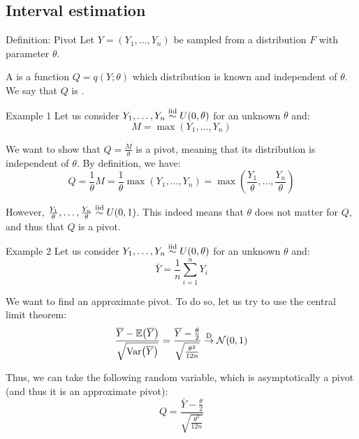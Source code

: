 \documentclass[a4paper]{article}
\begin{document}
\subsection{Interval estimation}

\begin{parag}{Definition: Pivot}
    Let $Y = \left(Y_1, \ldots, Y_n\right)$ be sampled from a distribution $F$ with parameter $\theta$.

    A  is a function $Q = q\left(Y; \theta\right)$ which distribution is known and independent of $\theta$. We say that $Q$ is .
\end{parag}

\begin{parag}{Example 1}
    Let us consider $Y_1, \ldots, Y_n \iid U\left(0, \theta\right)$ for an unknown $\theta$ and:
    \[M = \max\left(Y_1, \ldots, Y_n\right)\]
    
    We want to show that $Q = \frac{M}{\theta}$ is a pivot, meaning that its distribution is independent of $\theta$. By definition, we have: 
    \[Q = \frac{1}{\theta} M = \frac{1}{\theta} \max\left(Y_1, \ldots, Y_n\right) = \max\left(\frac{Y_1}{\theta}, \ldots, \frac{Y_n}{\theta}\right)\]

    However, $\frac{Y_1}{\theta}, \ldots, \frac{Y_n}{\theta} \iid U\left(0, 1\right)$. This indeed means that $\theta$ does not matter for $Q$, and thus that $Q$ is a pivot.
\end{parag}

\begin{parag}{Example 2}
    Let us consider $Y_1, \ldots, Y_n \iid U\left(0, \theta\right)$ for an unknown $\theta$ and:
    \[\bar{Y} = \frac{1}{n} \sum_{i=1}^{n} Y_i\]

    We want to find an approximate pivot. To do so, let us try to use the central limit theorem: 
    \[\frac{\bar{Y} - \exval\left(\bar{Y}\right)}{\sqrt{\Var\left(\bar{Y}\right)}} = \frac{\bar{Y} - \frac{\theta}{2}}{\sqrt{\frac{\theta^2}{12 n}}} \over{\to}{D} \mathcal{N}\left(0, 1\right)\]
    
    Thus, we can take the following random variable, which is asymptotically a pivot (and thus it is an approximate pivot): 
    \[Q = \frac{\bar{Y} - \frac{\theta}{2}}{\sqrt{\frac{\theta^2}{12n}}}\]
\end{parag}
\end{document}
